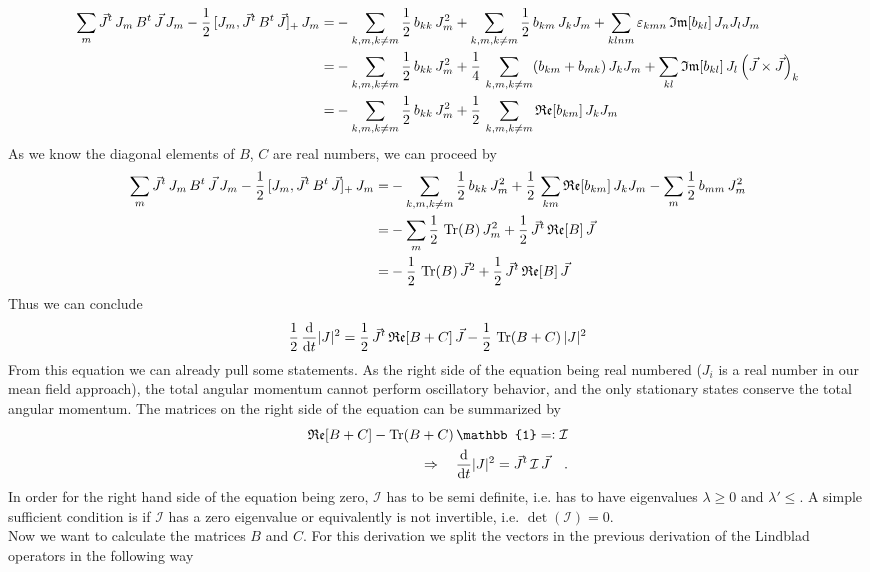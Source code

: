 \documentclass{article}
\begin{document}
\begin{align*}
    \sum_m\vec{J}^t\,J_m\,B^t\,\vec{J}\,J_m-\frac{1}{2}\,[J_m,\vec{J}^t\,B^t\,\vec{J}]_+\,J_m=&-\sum_{k,m,k\neq m}\frac{1}{2}\,b_{kk}\, J_m^2  + \sum_{k,m,k\neq m}\frac{1}{2}\,b_{km}\,J_kJ_m + \sum_{klnm}\varepsilon_{kmn}\,\mathfrak{Im}[b_{kl}]\, J_n J_l J_m\\
    =&-\sum_{k,m,k\neq m}\frac{1}{2}\,b_{kk}\, J_m^2  + \frac{1}{4}\, \sum_{k,m,k\neq m}(b_{km}+b_{mk})\,J_kJ_m + \sum_{kl}\mathfrak{Im}[b_{kl}]\, J_l \left( \vec{J}\times \vec{J}  \right)_k\\
    =&-\sum_{k,m,k\neq m}\frac{1}{2}\,b_{kk}\, J_m^2  + \frac{1}{2}\, \sum_{k,m,k\neq m} \mathfrak{Re}[b_{km}]\,J_kJ_m 
\end{align*}
As we know the diagonal elements of $B$, $C$ are real numbers, we can proceed by
\begin{align*}
    \sum_m\vec{J}^t\,J_m\,B^t\,\vec{J}\,J_m-\frac{1}{2}\,[J_m,\vec{J}^t\,B^t\,\vec{J}]_+\,J_m=&-\sum_{k,m,k\neq m}\frac{1}{2}\,b_{kk}\, J_m^2  + \frac{1}{2}\, \sum_{km} \mathfrak{Re}[b_{km}]\,J_kJ_m -\sum_m \frac{1}{2}\, b_{mm}\,J_m^2\\
    =&-\sum_{m}\frac{1}{2}\,\operatorname{Tr} (B)\, J_m^2  + \frac{1}{2}\,\vec{J}^t\,\mathfrak{Re}[B]\,\vec{J}\\
    =&-\frac{1}{2}\,\operatorname{Tr} (B)\, \vec{J}^2  + \frac{1}{2}\,\vec{J}^t\,\mathfrak{Re}[B]\,\vec{J}
\end{align*}
Thus we can conclude
\begin{align*}
    \frac{1}{2}\,\frac{\text{d}}{\text{d}t} |J|^2=\frac{1}{2}\,\vec{J}^t\,\mathfrak{Re}[B+C]\,\vec{J} - \frac{1}{2}\, \operatorname{Tr} (B+C) \,|J|^2
\end{align*}
From this equation we can already pull some statements. As the right side of the equation being real numbered ($J_i$ is a real number in our mean field approach), the total angular momentum cannot perform oscillatory behavior, and the only stationary states conserve the total angular momentum. The matrices on the right side of the equation can be summarized by
\begin{align*}
    \mathfrak{Re}[B+C]-\Tr (B+C)\,\mathbb{1}=\vcentcolon\mathcal{I}\\
    \Rightarrow\quad\dt |J|^2=\vec{J}^t\,\mathcal{I}\,\vec{J}\quad.
\end{align*}
In order for the right hand side of the equation being zero, $\mathcal{I}$ has to be semi definite, i.e. has to have eigenvalues $\lambda\geq0$ and $\lambda'\leq$. A simple sufficient condition is if $\mathcal{I}$  has a zero eigenvalue or equivalently is not invertible, i.e. $\det(\mathcal{I})=0$.\\
Now we want to calculate the matrices $B$ and $C$. For this derivation we split the vectors in the previous derivation of the Lindblad operators in the following way
\end{document}
